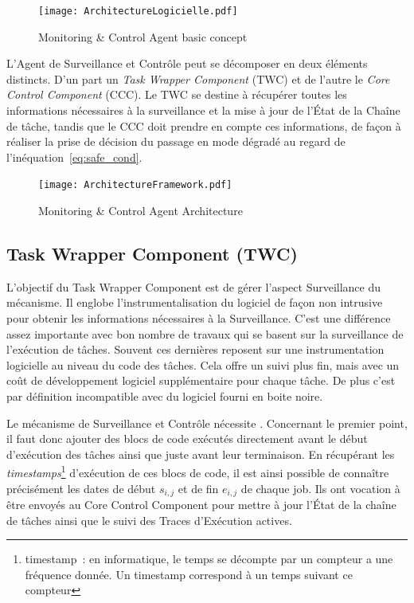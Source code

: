 \documentclass[french, a4paper, 11pt, twoside, pdftex]{StyleThese}
\begin{document}
\begin{figure}[ht]
            \centering
            \texttt{[image: ArchitectureLogicielle.pdf]}
            \caption{Monitoring \& Control Agent basic concept} \label{fig:SoftwareArchitecture}
\end{figure}

	L'Agent de Surveillance et Contrôle peut se décomposer en deux éléments distincts. D'un part un \emph{Task Wrapper Component} (TWC) et de l'autre le \emph{Core Control Component} (CCC). Le TWC se destine à récupérer toutes les informations nécessaires à la surveillance et la mise à jour de l'État de la Chaîne de tâche, tandis que le CCC doit prendre en compte ces informations, de façon à réaliser la prise de décision du passage en mode dégradé au regard de l'inéquation~\ref{eq:safe_cond}.
	
	
        \begin{figure}[ht]
            \centering
            \texttt{[image: ArchitectureFramework.pdf]}
            \caption{Monitoring \& Control Agent Architecture\label{fig:architecture}}
        \end{figure}
        
        
        \subsection{Task Wrapper Component (TWC)} 
        
        L'objectif du Task Wrapper Component est de gérer l'aspect Surveillance du mécanisme. Il englobe l'instrumentalisation du logiciel de façon non intrusive pour obtenir les informations nécessaires à la Surveillance. C'est une différence assez importante avec bon nombre de travaux qui se basent sur la surveillance de l'exécution de tâches. Souvent ces dernières reposent sur une instrumentation logicielle au niveau du code des tâches. Cela offre un suivi plus fin, mais avec un coût de développement logiciel supplémentaire pour chaque tâche. De plus c'est par définition incompatible avec du logiciel fourni en boite noire.
        
        Le mécanisme de Surveillance et Contrôle nécessite . Concernant le premier point, il faut donc ajouter des blocs de code exécutés directement avant le début d'exécution des tâches ainsi que juste avant leur terminaison. En récupérant les \textit{timestamps}\footnote{timestamp~: en informatique, le temps se décompte par un compteur a une fréquence donnée. Un timestamp correspond à un temps suivant ce compteur} d'exécution de ces blocs de code, il est ainsi possible de connaître précisément les dates de début $s_{i,j}$ et de fin $e_{i,j}$ de chaque job. Ils ont vocation à être envoyés au Core Control Component pour mettre à jour l'État de la chaîne de tâches ainsi que le suivi des Traces d'Exécution actives.
        
\end{document}
